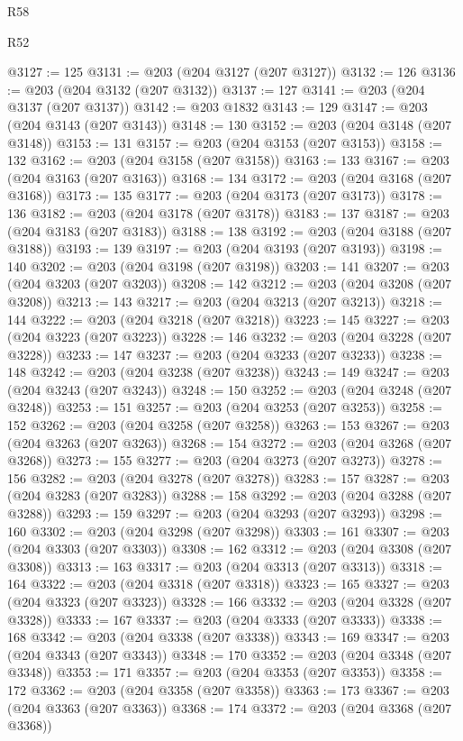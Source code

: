 \begin{lexlean}{R58}
\begin{lexlean}{R52}
\begin{coremodule}
{{{{{{{{{{{{{{{{{{{{{{{{{{{{{{{{{{{{{{{{{{{{{{{{{{{{{{{{{{{{{{{{{{{{{{{{{{{{{{{{{{{{{{{{{{{{{{{{{{{{{{{{{{{{{{{{{{{{{{{{{{{{{{{{{{{{{{{{{{{{{{{{{{{{{{{{{{{{{{{{{{{{{{{{{{{{{{{{{{{{{{{{{{{{{{{{{{{{{{@3127 := 125
@3131 := @203 (@204 @3127 (@207 @3127))
@3132 := 126
@3136 := @203 (@204 @3132 (@207 @3132))
@3137 := 127
@3141 := @203 (@204 @3137 (@207 @3137))
@3142 := @203 @1832
@3143 := 129
@3147 := @203 (@204 @3143 (@207 @3143))
@3148 := 130
@3152 := @203 (@204 @3148 (@207 @3148))
@3153 := 131
@3157 := @203 (@204 @3153 (@207 @3153))
@3158 := 132
@3162 := @203 (@204 @3158 (@207 @3158))
@3163 := 133
@3167 := @203 (@204 @3163 (@207 @3163))
@3168 := 134
@3172 := @203 (@204 @3168 (@207 @3168))
@3173 := 135
@3177 := @203 (@204 @3173 (@207 @3173))
@3178 := 136
@3182 := @203 (@204 @3178 (@207 @3178))
@3183 := 137
@3187 := @203 (@204 @3183 (@207 @3183))
@3188 := 138
@3192 := @203 (@204 @3188 (@207 @3188))
@3193 := 139
@3197 := @203 (@204 @3193 (@207 @3193))
@3198 := 140
@3202 := @203 (@204 @3198 (@207 @3198))
@3203 := 141
@3207 := @203 (@204 @3203 (@207 @3203))
@3208 := 142
@3212 := @203 (@204 @3208 (@207 @3208))
@3213 := 143
@3217 := @203 (@204 @3213 (@207 @3213))
@3218 := 144
@3222 := @203 (@204 @3218 (@207 @3218))
@3223 := 145
@3227 := @203 (@204 @3223 (@207 @3223))
@3228 := 146
@3232 := @203 (@204 @3228 (@207 @3228))
@3233 := 147
@3237 := @203 (@204 @3233 (@207 @3233))
@3238 := 148
@3242 := @203 (@204 @3238 (@207 @3238))
@3243 := 149
@3247 := @203 (@204 @3243 (@207 @3243))
@3248 := 150
@3252 := @203 (@204 @3248 (@207 @3248))
@3253 := 151
@3257 := @203 (@204 @3253 (@207 @3253))
@3258 := 152
@3262 := @203 (@204 @3258 (@207 @3258))
@3263 := 153
@3267 := @203 (@204 @3263 (@207 @3263))
@3268 := 154
@3272 := @203 (@204 @3268 (@207 @3268))
@3273 := 155
@3277 := @203 (@204 @3273 (@207 @3273))
@3278 := 156
@3282 := @203 (@204 @3278 (@207 @3278))
@3283 := 157
@3287 := @203 (@204 @3283 (@207 @3283))
@3288 := 158
@3292 := @203 (@204 @3288 (@207 @3288))
@3293 := 159
@3297 := @203 (@204 @3293 (@207 @3293))
@3298 := 160
@3302 := @203 (@204 @3298 (@207 @3298))
@3303 := 161
@3307 := @203 (@204 @3303 (@207 @3303))
@3308 := 162
@3312 := @203 (@204 @3308 (@207 @3308))
@3313 := 163
@3317 := @203 (@204 @3313 (@207 @3313))
@3318 := 164
@3322 := @203 (@204 @3318 (@207 @3318))
@3323 := 165
@3327 := @203 (@204 @3323 (@207 @3323))
@3328 := 166
@3332 := @203 (@204 @3328 (@207 @3328))
@3333 := 167
@3337 := @203 (@204 @3333 (@207 @3333))
@3338 := 168
@3342 := @203 (@204 @3338 (@207 @3338))
@3343 := 169
@3347 := @203 (@204 @3343 (@207 @3343))
@3348 := 170
@3352 := @203 (@204 @3348 (@207 @3348))
@3353 := 171
@3357 := @203 (@204 @3353 (@207 @3353))
@3358 := 172
@3362 := @203 (@204 @3358 (@207 @3358))
@3363 := 173
@3367 := @203 (@204 @3363 (@207 @3363))
@3368 := 174
@3372 := @203 (@204 @3368 (@207 @3368))
}}}}}}}}}}}}}}}}}}}}}}}}}}}}}}}}}}}}}}}}}}}}}}}}}}}}}}}}}}}}}}}}}}}}}}}}}}}}}}}}}}}}}}}}}}}}}}}}}}}}}}}}}}}}}}}}}}}}}}}}}}}}}}}}}}}}}}}}}}}}}}}}}}}}}}}}}}}}}}}}}}}}}}}}}}}}}}}}}}}}}}}}}}}}}}}}}}}}}}
\end{coremodule}
\end{lexlean}
\end{lexlean}
